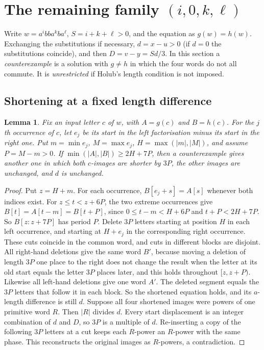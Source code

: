 \documentclass[11pt]{article}
\newtheorem{lemma}[theorem]{Lemma}
\theoremstyle{remark}\newtheorem*{remark}{Remark}
\begin{document}
\section{The remaining family \((i,0,k,\ell)\)}\label{sec:rem}
Write \(w=a^ibba^kba^\ell\), \(S=i+k+\ell>0\), and the equation as \(g(w)=h(w)\). Exchanging the substitutions if necessary, \(d=x-u>0\) (if \(d=0\) the substitutions coincide), and then \(D=v-y=Sd/3\). In this section a \emph{counterexample} is a solution with \(g\ne h\) in which the four words do not all commute. It is \emph{unrestricted} if Holub's length condition is not imposed.

\subsection{Shortening at a fixed length difference}
\begin{lemma}\label{shorten}
Fix an input letter \(c\) of \(w\), with \(A=g(c)\) and \(B=h(c)\). For the \(j\)th occurrence of \(c\), let \(e_j\) be its start in the left factorisation minus its start in the right one. Put \(m=\min e_j\), \(M=\max e_j\), \(H=\max(|m|,|M|)\), and assume \(P=M-m>0\). If \(\min(|A|,|B|)\ge2H+7P\), then a counterexample gives another one in which both \(c\)-images are shorter by \(3P\), the other images are unchanged, and \(d\) is unchanged.
\end{lemma}
\begin{proof}
Put \(z=H+m\). For each occurrence, \(B[e_j+s]=A[s]\) whenever both indices exist. For \(z\le t<z+6P\), the two extreme occurrences give \(B[t]=A[t-m]=B[t+P]\), since \(0\le t-m<H+6P\) and \(t+P<2H+7P\). So \(B[z:z+7P]\) has period \(P\).
Delete \(3P\) letters starting at position \(H\) in each left occurrence, and starting at \(H+e_j\) in the corresponding right occurrence. These cuts coincide in the common word, and cuts in different blocks are disjoint. All right-hand deletions give the same word \(B'\), because moving a deletion of length \(3P\) one place to the right does not change the result when the letter at its old start equals the letter \(3P\) places later, and this holds throughout \([z,z+P)\). Likewise all left-hand deletions give one word \(A'\). The deleted segment equals the \(3P\) letters that follow it in each block. So the shortened equation holds, and its \(a\)-length difference is still \(d\).
Suppose all four shortened images were powers of one primitive word \(R\). Then \(|R|\) divides \(d\). Every start displacement is an integer combination of \(d\) and \(D\), so \(3P\) is a multiple of \(d\). Re-inserting a copy of the following \(3P\) letters at a cut keeps each \(R\)-power an \(R\)-power with the same phase. This reconstructs the original images as \(R\)-powers, a contradiction.
\end{proof}
\end{document}
